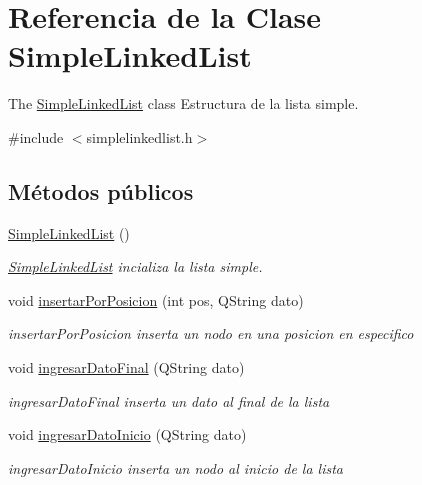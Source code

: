 \hypertarget{class_simple_linked_list}{}\section{Referencia de la Clase Simple\+Linked\+List}
\label{class_simple_linked_list}


The \mbox{\hyperlink{class_simple_linked_list}{Simple\+Linked\+List}} class Estructura de la lista simple.  




{\ttfamily \#include $<$simplelinkedlist.\+h$>$}

\subsection*{Métodos públicos}
\begin{DoxyCompactItemize}
\item 
\mbox{\hyperlink{class_simple_linked_list_a508909ddc17e7be9e6c37554cac42bf7}{Simple\+Linked\+List}} ()
\begin{DoxyCompactList}\small\item\em \mbox{\hyperlink{class_simple_linked_list}{Simple\+Linked\+List}} incializa la lista simple. \end{DoxyCompactList}\item 
void \mbox{\hyperlink{class_simple_linked_list_aac2d1b432374ecbc20e8d9c5ba738fa7}{insertar\+Por\+Posicion}} (int pos, Q\+String dato)
\begin{DoxyCompactList}\small\item\em insertar\+Por\+Posicion inserta un nodo en una posicion en especifico \end{DoxyCompactList}\item 
void \mbox{\hyperlink{class_simple_linked_list_a2da267887f7b64579e3eb56c1940b20a}{ingresar\+Dato\+Final}} (Q\+String dato)
\begin{DoxyCompactList}\small\item\em ingresar\+Dato\+Final inserta un dato al final de la lista \end{DoxyCompactList}\item 
void \mbox{\hyperlink{class_simple_linked_list_aef2841b155c31147e5932c13302f39c4}{ingresar\+Dato\+Inicio}} (Q\+String dato)
\begin{DoxyCompactList}\small\item\em ingresar\+Dato\+Inicio inserta un nodo al inicio de la lista \end{DoxyCompactList}\item 

\end{DoxyCompactItemize}
